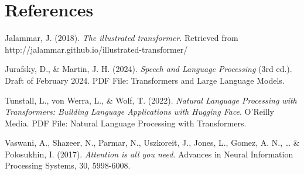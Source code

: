 \documentclass[11pt]{article}
\begin{document}
    \section{References}\label{references}

    Jalammar, J. (2018). \emph{The illustrated transformer}. Retrieved from
http://jalammar.github.io/illustrated-transformer/

Jurafsky, D., \& Martin, J. H. (2024). \emph{Speech and Language
Processing} (3rd ed.). Draft of February 2024. PDF File: Transformers
and Large Language Models.

Tunstall, L., von Werra, L., \& Wolf, T. (2022). \emph{Natural Language
Processing with Transformers: Building Language Applications with
Hugging Face}. O'Reilly Media. PDF File: Natural Language Processing
with Transformers.

Vaswani, A., Shazeer, N., Parmar, N., Uszkoreit, J., Jones, L., Gomez,
A. N., \ldots{} \& Polosukhin, I. (2017). \emph{Attention is all you
need}. Advances in Neural Information Processing Systems, 30, 5998-6008.


    
    
    
\end{document}
